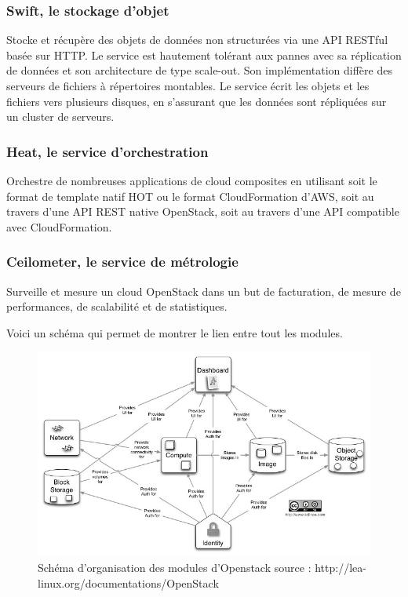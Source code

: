 \documentclass[]{article}
\begin{document}
\subsubsection{Swift, le stockage
d'objet}\label{swift-le-stockage-dobjet}

Stocke et récupère des objets de données non structurées via une API
RESTful basée sur HTTP. Le service est hautement tolérant aux pannes
avec sa réplication de données et son architecture de type scale-out.
Son implémentation diffère des serveurs de fichiers à répertoires
montables. Le service écrit les objets et les fichiers vers plusieurs
disques, en s'assurant que les données sont répliquées sur un cluster de
serveurs.

\subsubsection{Heat, le service
d'orchestration}\label{heat-le-service-dorchestration}

Orchestre de nombreuses applications de cloud composites en utilisant
soit le format de template natif HOT ou le format CloudFormation d'AWS,
soit au travers d'une API REST native OpenStack, soit au travers d'une
API compatible avec CloudFormation.

\subsubsection{Ceilometer, le service de
métrologie}\label{ceilometer-le-service-de-muxe9trologie}

Surveille et mesure un cloud OpenStack dans un but de facturation, de
mesure de performances, de scalabilité et de statistiques.

Voici un schéma qui permet de montrer le lien entre tout les modules.

\begin{figure}
\centering
\includegraphics{Images/Openstack_diagramme_conceptuel.jpg}
\caption{Schéma d'organisation des modules d'Openstack \footnotesize{source : http://lea-linux.org/documentations/OpenStack} }
\end{figure}
\end{document}
